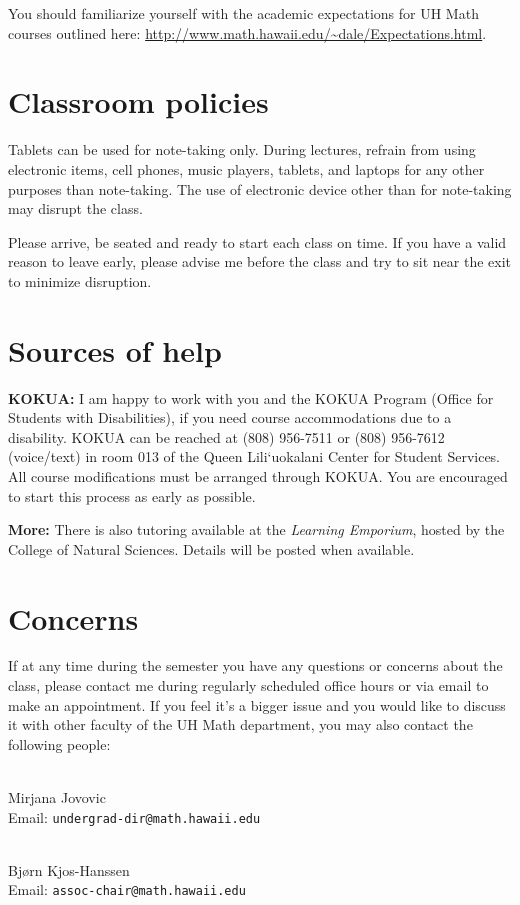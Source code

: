 \documentclass[12pt]{amsart}
\newcommand{\spacer}{\vspace{.2cm}}
\newcommand{\svs}{\vspace{.1cm}}
\begin{document}
 You should familiarize yourself with the  academic expectations for UH Math courses outlined here: 
\newline \url{http://www.math.hawaii.edu/~dale/Expectations.html}.

\section*{Classroom policies}
Tablets can be used for note-taking only. During lectures, refrain from using electronic items, cell phones, music players, tablets, and laptops for any other purposes than note-taking. The use of electronic device other than for note-taking may disrupt the class.

Please arrive, be seated and ready to start each class on time. If you have a valid reason to leave early, please advise me before the class and try to sit near the exit to minimize disruption.

\section*{Sources of help}
{\bf KOKUA:} I am happy to work with you and the KOKUA Program (Office for Students with Disabilities), if you need course accommodations due to a disability. KOKUA can be reached at (808) 956-7511 or (808) 956-7612 (voice/text) in room 013 of the Queen Lili`uokalani Center for Student Services. All course modifications must be arranged through KOKUA. You are encouraged to start this process as early as possible.\svs

{\bf More:} There is also tutoring available at the \textit{Learning Emporium}, hosted by the College of Natural Sciences. Details will be posted when available.

\section*{Concerns}
If at any time during the semester you have any questions or concerns about the class, please contact me during regularly scheduled office hours or via email to make an appointment. If you feel it's a bigger issue and you would like to discuss it with other faculty of the UH Math department, you may also contact the following people:
\spacer

\\
Mirjana Jovovic \\
Email: \texttt{undergrad-dir@math.hawaii.edu}

\svs
{}\\
Bj{\o}rn Kjos-Hanssen \\
Email: \texttt{assoc-chair@math.hawaii.edu}
\end{document}
